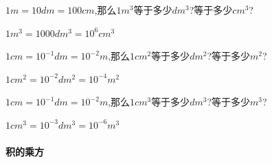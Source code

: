\documentclass[cn,blue,12pt]{elegantbook}
\begin{document}
\begin{xiti}[resume]
\item \(1m=10dm=100cm\),那么\(1m^3\)等于多少\(dm^3\)?等于多少\(cm^3\)?
\begin{solution}
        \(1m^3=1000dm^3=10^6cm^3\)\\
\end{solution}
\item \(1cm=10^{-1}dm=10^{-2}m\),那么\(1cm^2\)等于多少\(dm^2\)?等于多少\(m^2\)?
\begin{solution}
        \(1cm^2=10^{-2}dm^2=10^{-4}m^2\)\\
\end{solution}
\item \(1cm=10^{-1}dm=10^{-2}m\),那么\(1cm^3\)等于多少\(dm^3\)?等于多少\(m^3\)?
\begin{solution}
        \(1cm^3=10^{-3}dm^3=10^{-6}m^3\)\\
\end{solution}
\end{xiti}

\paragraph{积的乘方}%
\label{par:积的乘方}
\end{document}

